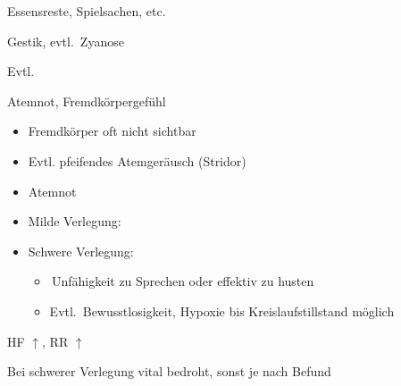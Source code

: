 {
\begin{ABCDESlide}
  \item[\ABCDE{1}] Essensreste, Spielsachen, etc.
  \item[\ABCDE{2}] Gestik, evtl. {\RedFlag}\,Zyanose
  \item[\ABCDE{3}] Evtl. {\RedFlag}\,
  \item[\ABCDE{4}] Atemnot, Fremdkörpergefühl
  \item[\ABCDE{A}] %
  \begin{itemize}
    \item Fremdkörper oft nicht sichtbar
    \item Evtl. pfeifendes Atemgeräusch (Stridor)
  \end{itemize}
  \item[\ABCDE{B}] %
  \begin{itemize}
    \item Atemnot
    \item Milde Verlegung: 
    \item Schwere Verlegung:
    \begin{itemize}
      \item {\RedFlag}\,Unfähigkeit zu Sprechen oder
      effektiv zu husten
      \item Evtl. {\RedFlag}\,Bewusstlosigkeit,
      Hypoxie bis Kreislaufstillstand möglich
    \end{itemize}
  \end{itemize}
  \item[\ABCDE{C}] HF $\uparrow$, RR $\uparrow$
  \item[\ABCDE{=}] Bei schwerer Verlegung vital bedroht,
  sonst je nach Befund
\end{ABCDESlide}
}
{}
{}
{}




